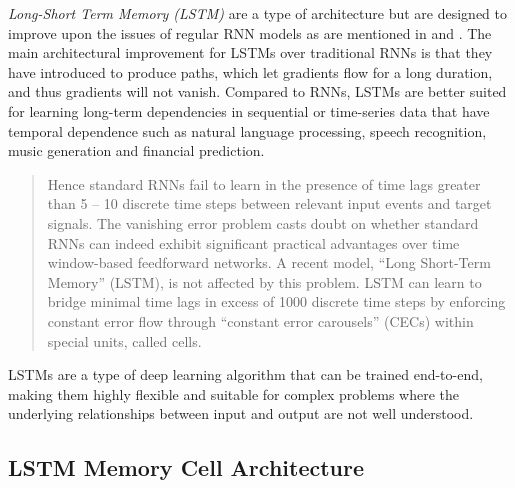         \emph{Long-Short Term Memory (LSTM)} \cite{hochreiterLongShortTermMemory1997} \cite{gravesLongShorttermMemory2012} are a type of  architecture but are designed to improve upon the issues of regular RNN models as are mentioned in  and . 
        The main architectural improvement for LSTMs over traditional RNNs is that they have introduced  to produce paths, which let gradients flow for a long duration, and thus gradients will not vanish.
        Compared to RNNs, LSTMs are better suited for learning long-term dependencies in sequential or time-series data that have temporal dependence such as natural language processing, speech recognition, music generation and financial prediction.
        \begin{quote}
            Hence standard RNNs fail to learn in the presence of time lags greater than 5 – 10 discrete time steps between relevant input events and target signals. The vanishing error problem casts doubt on whether standard RNNs can indeed exhibit significant practical advantages over time window-based feedforward networks. A recent model, “Long Short-Term Memory” (LSTM), is not affected by this problem. LSTM can learn to bridge minimal time lags in excess of 1000 discrete time steps by enforcing constant error flow through “constant error carousels” (CECs) within special units, called cells. \cite{gersLearningForgetContinual2000}
        \end{quote}
        LSTMs are a type of deep learning algorithm that can be trained end-to-end, making them highly flexible and suitable for complex problems where the underlying relationships between input and output are not well understood.



        \subsection{LSTM Memory Cell Architecture}
        \label{sec:lstm-memory-cell-architecture-background}

